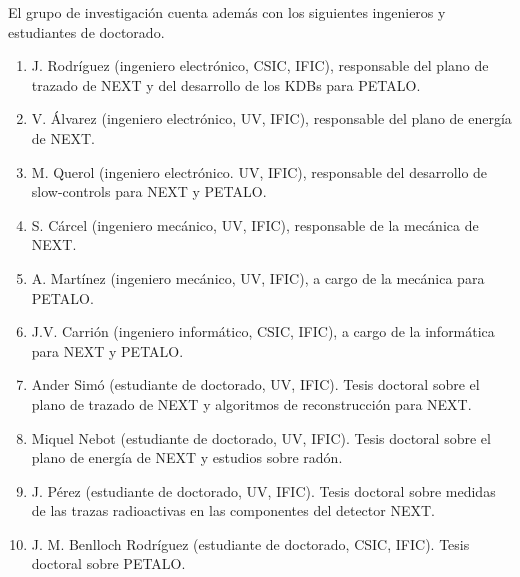 El grupo de investigación cuenta además con los siguientes ingenieros y estudiantes de doctorado. 
\begin{enumerate}
\item J. Rodríguez (ingeniero electrónico, CSIC, IFIC), responsable del plano de trazado de NEXT y del desarrollo de los KDBs para PETALO. 
\item V. Álvarez (ingeniero electrónico, UV, IFIC), responsable del plano de energía de NEXT.
\item M. Querol (ingeniero electrónico. UV, IFIC), responsable del desarrollo de slow-controls para NEXT y PETALO.
\item S. Cárcel (ingeniero mecánico, UV, IFIC), responsable de la mecánica de NEXT.
\item A. Martínez (ingeniero mecánico, UV, IFIC), a cargo de la mecánica para PETALO. 
\item J.V. Carrión (ingeniero informático, CSIC, IFIC), a cargo de la informática para NEXT y PETALO. 
\item Ander Simó (estudiante de doctorado, UV, IFIC). Tesis doctoral sobre el plano de trazado de NEXT y algoritmos de reconstrucción para NEXT.
\item Miquel Nebot (estudiante de doctorado, UV, IFIC). Tesis doctoral sobre el plano de energía de NEXT y estudios sobre radón.
\item J. Pérez (estudiante de doctorado, UV, IFIC). Tesis doctoral sobre medidas de las trazas radioactivas en las componentes del detector NEXT.
\item J. M. Benlloch Rodríguez (estudiante de doctorado, CSIC, IFIC). Tesis doctoral sobre PETALO.  
\end{enumerate}
























